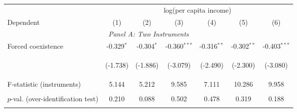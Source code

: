 \begin{center}
\begin{tabular}{lcccccc}
\hline \noalign{\smallskip} & \multicolumn{6}{c}{log(per capita income)}\\
Dependent & (1) & (2) & (3) & (4) & (5) & (6)\\
\hline \multicolumn{7}{c}{\textit{Panel A: Two Instruments}}\\
\noalign{\smallskip}\noalign{\smallskip}Forced coexistence & -0.329$ ^*$ & -0.304$ ^*$ & -0.360$ ^{***}$ & -0.316$ ^{**}$ & -0.302$ ^{**}$ & -0.403$ ^{***}$\\
 & \begin{footnotesize}(-1.738)\end{footnotesize} & \begin{footnotesize}(-1.886)\end{footnotesize} & \begin{footnotesize}(-3.079)\end{footnotesize} & \begin{footnotesize}(-2.490)\end{footnotesize} & \begin{footnotesize}(-2.300)\end{footnotesize} & \begin{footnotesize}(-3.080)\end{footnotesize}\\
\noalign{\smallskip}F-statistic (instruments) & 5.144 & 5.212 & 9.585 & 7.111 & 10.286 & 9.958\\
 & \begin{footnotesize}\end{footnotesize} & \begin{footnotesize}\end{footnotesize} & \begin{footnotesize}\end{footnotesize} & \begin{footnotesize}\end{footnotesize} & \begin{footnotesize}\end{footnotesize} & \begin{footnotesize}\end{footnotesize}\\
\noalign{\smallskip}$ p$-val. (over-identification test) & 0.210 & 0.088 & 0.502 & 0.478 & 0.319 & 0.188\\
 & \begin{footnotesize}\end{footnotesize} & \begin{footnotesize}\end{footnotesize} & \begin{footnotesize}\end{footnotesize} & \begin{footnotesize}\end{footnotesize} & \begin{footnotesize}\end{footnotesize} & \begin{footnotesize}\end{footnotesize}\\

\end{tabular}
\end{center}
